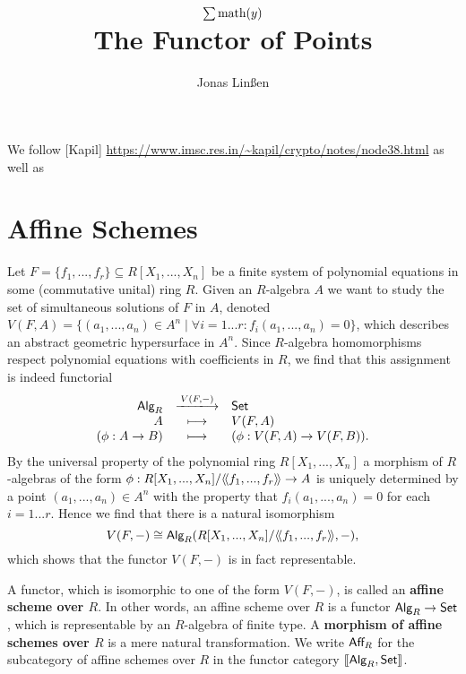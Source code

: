 

\usepackage{extarrows}

\title{$\sum \text{math}(y)$\\The Functor of Points}
\author{Jonas Linßen}



	\maketitle
	\tableofcontents

	We follow [Kapil] \url{https://www.imsc.res.in/~kapil/crypto/notes/node38.html} as well as 


	\newpage
	\section{Affine Schemes}

	Let $F=\{f_1,...,f_r\} \subseteq R[X_1,...,X_n]$ be a finite system of polynomial equations in some (commutative unital) ring $R$. Given an $R$-algebra $A$ we want to study the set of simultaneous solutions of $F$ in $A$, denoted $V(F,A)=\{(a_1,...,a_n) \in A^n \mid \forall i=1 ... r: f_i(a_1,...,a_n) = 0 \}$, which describes an abstract geometric hypersurface in $A^n$.
	Since $R$-algebra homomorphisms respect polynomial equations with coefficients in $R$, we find that this assignment is indeed functorial
	\begin{equation*}
		\begin{array}{rcl}
			\ncat{Alg}_R&\xlongrightarrow{V(F,-)}&\ncat{Set}\\
			A&\longmapsto&V(F,A)\\
			(\phi:A\rightarrow B)&\longmapsto&(\phi:V(F,A)\rightarrow V(F,B)).
		\end{array}
	\end{equation*}
	By the universal property of the polynomial ring $R[X_1,...,X_n]$ a morphism of $R$-algebras of the form $\phi:R[X_1,...,X_n]/\langle\!\langle f_1,...,f_r \rangle\!\rangle \rightarrow A$ is uniquely determined by a point $(a_1,...,a_n)\in A^n$ with the property that $f_i(a_1,...,a_n)=0$ for each $i=1...r$. Hence we find that there is a natural isomorphism 
	\begin{equation*}
		V(F,-) \cong \textsf{Alg}_R(R[X_1,...,X_n]/\langle\!\langle f_1,...,f_r \rangle\!\rangle,-),
	\end{equation*}
	which shows that the functor $V(F,-)$ is in fact representable.

	\begin{definition}
		A functor, which is isomorphic to one of the form $V(F,-)$, is called an \textbf{affine scheme over $R$}. In other words, an affine scheme over $R$ is a functor $\textsf{Alg}_R \rightarrow \textsf{Set}$, which is representable by an $R$-algebra of finite type. A \textbf{morphism of affine schemes over $R$} is a mere natural transformation. We write $\textsf{Aff}_R$ for the subcategory of affine schemes over $R$ in the functor category $|[\textsf{Alg}_R,\textsf{Set}|]$.
	\end{definition}

